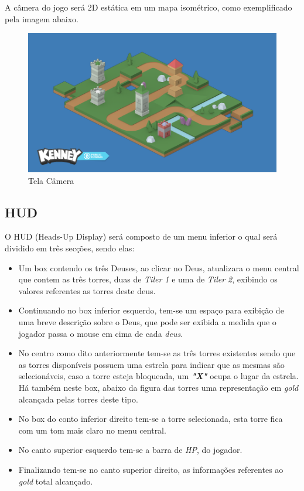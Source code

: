 \documentclass[11pt]{article} %
\begin{document}
A câmera do jogo será 2D estática em um mapa isométrico, como exemplificado pela imagem abaixo.
\begin{figure}[!htp]
\centering
\includegraphics[scale=0.25]{res/map_example.png}
\caption{Tela Câmera}
\label{Tela Barracks}
\end{figure}

\subsection{HUD}

O HUD (Heads-Up Display) será composto de um menu inferior o qual será dividido em três secções, sendo elas:
\begin{itemize}
\item Um box contendo os três Deuses, ao clicar no Deus, atualizara o menu central que contem as três torres, duas de \textit{Tiler 1} e uma de \textit{Tiler 2}, exibindo os valores referentes as torres deste deus.
\item Continuando no box inferior esquerdo, tem-se um espaço para exibição de uma breve descrição sobre o Deus, que pode ser exibida a medida que o jogador passa o mouse em cima de cada \textit{deus}.
\item No centro como dito anteriormente tem-se as três torres existentes sendo que as torres disponíveis possuem uma estrela para indicar que as mesmas são selecionáveis, caso a torre esteja bloqueada, um \textit{\textbf{"X"}} ocupa o lugar da estrela. Há também neste box, abaixo da figura das torres uma representação em \textit{gold} alcançada pelas torres deste tipo.
\item No box do conto inferior direito tem-se a torre selecionada, esta torre fica com um tom mais claro no menu central.
\item No canto superior esquerdo tem-se a barra de \textit{HP}, do jogador.
\item Finalizando tem-se no canto superior direito, as informações referentes ao \textit{gold} total alcançado.
\end{itemize}
\end{document}
